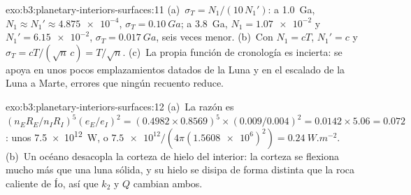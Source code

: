 \begin{solution}{exo:b3:planetary-interiors-surfaces:11}
(a)~$\sigma_T = N_1/(10\,N_1')$: a \qty{1.0}{Ga}, $N_1 \approx N_1' \approx
\num{4.875e-4}$, $\sigma_T = \qty{0.10}{Ga}$; a \qty{3.8}{Ga}, $N_1 =
\num{1.07e-2}$ y $N_1' = \num{6.15e-2}$, $\sigma_T = \qty{0.017}{Ga}$,
seis veces menor. (b)~Con $N_1 = cT$, $N_1' = c$ y $\sigma_T =
cT/(\sqrt n\,c) = T/\sqrt n$. (c)~La propia función de cronología es
incierta: se apoya en unos pocos emplazamientos datados de la Luna y en el escalado
de la Luna a Marte, errores que ningún recuento reduce.
\end{solution}

\begin{solution}{exo:b3:planetary-interiors-surfaces:12}
(a)~La razón es $(n_ER_E/n_IR_I)^5(e_E/e_I)^2 = (0.4982\times0.8569)^5
\times(0.009/0.004)^2 = 0.0142\times5.06 = 0.072$: unos
\qty{7.5e12}{W}, o $\num{7.5e12}/(4\pi(\num{1.5608e6})^2) =
\qty{0.24}{W.m^{-2}}$. (b)~Un océano desacopla la corteza de hielo del
interior: la corteza se flexiona mucho más que una luna sólida, y su hielo
se disipa de forma distinta que la roca caliente de Ío, así que $k_2$ y $Q$ cambian ambos.
\end{solution}

